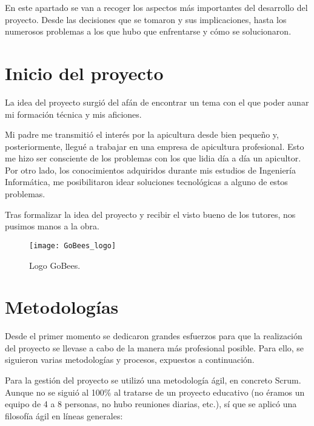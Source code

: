 
En este apartado se van a recoger los aspectos más importantes del
desarrollo del proyecto. Desde las decisiones que se tomaron y sus
implicaciones, hasta los numerosos problemas a los que hubo que
enfrentarse y cómo se solucionaron.

\section{Inicio del proyecto}\label{inicio-del-proyecto}

La idea del proyecto surgió del afán de encontrar un tema con el que
poder aunar mi formación técnica y mis aficiones.

Mi padre me transmitió el interés por la apicultura desde bien pequeño
y, posteriormente, llegué a trabajar en una empresa de apicultura
profesional. Esto me hizo ser consciente de los problemas con los que
lidia día a día un apicultor. Por otro lado, los conocimientos
adquiridos durante mis estudios de Ingeniería Informática, me
posibilitaron idear soluciones tecnológicas a alguno de estos problemas.

Tras formalizar la idea del proyecto y recibir el visto bueno de los
tutores, nos pusimos manos a la obra.

\begin{figure}[H]
	\centering
	\texttt{[image: GoBees\_logo]}
	\caption{Logo GoBees.}
	\label{fig:logo}
\end{figure}

\section{Metodologías}\label{metodologias-proyecto}

Desde el primer momento se dedicaron grandes esfuerzos para que la
realización del proyecto se llevase a cabo de la manera más profesional
posible. Para ello, se siguieron varias metodologías y procesos,
expuestos a continuación.

Para la gestión del proyecto se utilizó una metodología ágil, en
concreto Scrum. Aunque no se siguió al 100\% al tratarse de un proyecto
educativo (no éramos un equipo de 4 a 8 personas, no hubo reuniones
diarias, etc.), sí que se aplicó una filosofía ágil en líneas generales:

